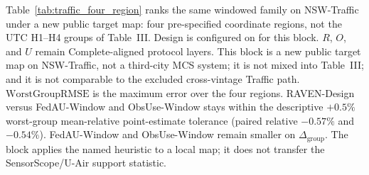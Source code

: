 Table~\ref{tab:traffic_four_region} ranks the same windowed family on
NSW-Traffic under a new public target map: four pre-specified coordinate
regions, not the UTC H1--H4 groups of Table~III.
Design is configured on for this block.
$R$, $O$, and $U$ remain Complete-aligned protocol layers.
This block is a new public target map on NSW-Traffic, not a third-city
MCS system; it is not mixed into Table~III;
and it is not comparable to the excluded cross-vintage Traffic path.
$\mathrm{WorstGroupRMSE}$ is the maximum error over the four regions.
RAVEN-Design versus FedAU-Window and ObsUse-Window stays within
the descriptive $+0.5\%$ worst-group mean-relative point-estimate
tolerance (paired relative $-0.57\%$ and $-0.54\%$).
FedAU-Window and ObsUse-Window remain smaller on $\Delta_{\mathrm{group}}$.
The block applies the named heuristic to a local map; it does not transfer
the SensorScope/U-Air support statistic.

